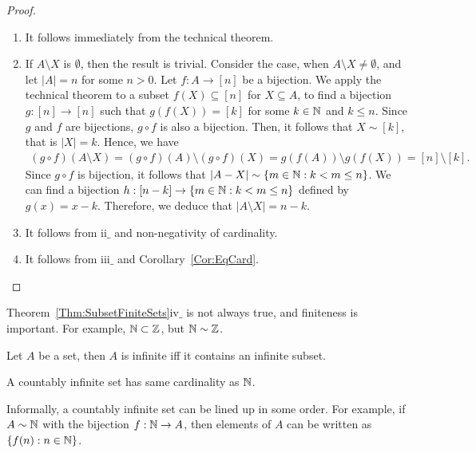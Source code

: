 \documentclass[a4paper,english,12pt]{article}   	%
\begin{document}
\begin{proof}
\begin{enumerate}[i$\_$]
	\item It follows immediately from the technical theorem. %
	\item If $A \setminus X$ is $\emptyset$, then the result is trivial. Consider the case, when $A \setminus X \neq \emptyset$, and let $|A| = n$ for some $n > 0$. Let $f \colon A \to [n]$ be a bijection. We apply the technical theorem to a subset $f(X) \subseteq [n]$ for $X \subseteq A$, to find a bijection $g \colon [n] \to [n]$ such that $g(f(X)) =  [k]$ for some $k \in \mathbb{N}$ and $k \leq n$. Since $g$ and $f$ are bijections, $g \circ f$ is also a bijection. Then, it follows that $X \sim  [k]$, that is $|X|=k$. Hence, we have
\begin{align*} 
(g \circ f)(A \setminus X)=(g \circ f)(A) \setminus (g \circ f)(X) = g(f(A)) \setminus g(f(X)) = [n] \setminus [k].
\end{align*}
Since $g \circ f$ is bijection, it follows that $|A-X| \sim \{m \in \mathbb{N}: k < m \leq n\}$. We can find a bijection $h: [n-k] \to \{m \in \mathbb{N}: k < m \leq n\}$ defined by $g(x) = x-k$. Therefore, we deduce that $|A \setminus X|=n-k$.
	\item It follows from ii$\_$ and non-negativity of cardinality.
	\item It follows from iii$\_$ and Corollary~\ref{Cor:EqCard}.
\end{enumerate}
\end{proof}
\begin{rem} Theorem~\ref{Thm:SubsetFiniteSets}iv$\_$ is not always true, and finiteness is important. For example, $\mathbb{N} \subset \mathbb{Z}$, but $\mathbb{N} \sim \mathbb{Z}$. 
\end{rem}
\begin{cor} Let $A$ be a set, then $A$ is infinite iff it contains an infinite subset.
\end{cor}
\begin{thm} A countably infinite set has same cardinality as $\mathbb{N}$.
\end{thm}
\begin{rem} Informally, a countably infinite set can be lined up in some order. For example, if $A \sim \mathbb{N}$ with the bijection $f: \mathbb{N} \to A$, then elements of $A$ can be written as $\{f(n): n \in \mathbb{N}\}$.
\end{rem}
\end{document}
